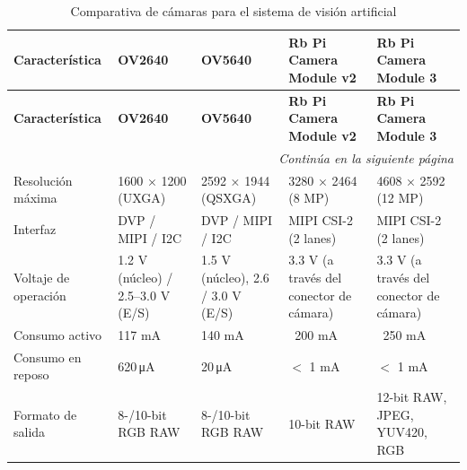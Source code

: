 \renewcommand{\arraystretch}{1.5}
\begin{longtable}{
    |p{2.9cm}
    |p{2.9cm}
    |p{2.9cm}
    |p{2.9cm}
    |p{2.9cm}|
}
\caption{Comparativa de cámaras para el sistema de visión artificial} 
\label{tab:cam_comparativa} \\
\hline
\textbf{Característica} & \textbf{OV2640} \cite{omnivision2006_OV2640} 
                        & \textbf{OV5640} \cite{omnivision2011_OV5640}
                        & \textbf{Rb Pi Camera Module v2} \cite{raspberrypi_camera2025}
                        & \textbf{Rb Pi Camera Module 3} \cite{raspberrypi_camera2025} \\
\hline
\endfirsthead

\hline
\textbf{Característica} & \textbf{OV2640} \cite{omnivision2006_OV2640} 
                        & \textbf{OV5640} \cite{omnivision2011_OV5640}
                        & \textbf{Rb Pi Camera Module v2} \cite{raspberrypi_camera2025}
                        & \textbf{Rb Pi Camera Module 3} \cite{raspberrypi_camera2025} \\

\hline
\endhead

\hline
\multicolumn{5}{r}{\textit{Continúa en la siguiente página}} \\
\endfoot

\hline
\endlastfoot

Resolución máxima 
    & 1600 × 1200 (UXGA) 
    & 2592 × 1944 (QSXGA) 
    & 3280 × 2464 (8 MP) 
    & 4608 × 2592 (12 MP) \\ \hline

Interfaz 
    & DVP / MIPI / I2C  
    & DVP / MIPI / I2C 
    & MIPI CSI-2 (2 lanes) 
    & MIPI CSI-2 (2 lanes) \\ \hline

Voltaje de operación 
    & 1.2 V (núcleo) / 2.5--3.0 V (E/S) 
    & 1.5 V (núcleo), 2.6 / 3.0 V (E/S) 
    & 3.3 V (a través del conector de cámara) 
    & 3.3 V (a través del conector de cámara) \\ \hline

Consumo activo 
    & 117 mA 
    & 140 mA
    & ~200 mA  
    & ~250 mA  \\ \hline

Consumo en reposo 
    & 620\,\unit{\micro\ampere} 
    & 20\,\unit{\micro\ampere} 
    & $<$ 1 mA 
    & $<$ 1 mA \\ \hline

Formato de salida 
    & 8-/10-bit RGB RAW 
    & 8-/10-bit RGB RAW 
    & 10-bit RAW 
    & 12-bit RAW, JPEG, YUV420, RGB \\ \hline


\end{longtable}
